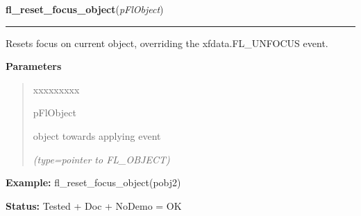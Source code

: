 \hspace{.8\funcindent}\begin{boxedminipage}{\funcwidth}

    \raggedright \textbf{fl\_reset\_focus\_object}(\textit{pFlObject})

    \vspace{-1.5ex}

    \rule{\textwidth}{0.5\fboxrule}
\setlength{\parskip}{2ex}
    Resets focus on current object, overriding the xfdata.FL\_UNFOCUS 
    event.

\setlength{\parskip}{1ex}
      \textbf{Parameters}
      \vspace{-1ex}

      \begin{quote}
        \begin{Ventry}{xxxxxxxxx}

          \item[pFlObject]

          object towards applying event

            {\it (type=pointer to FL\_OBJECT)}

        \end{Ventry}

      \end{quote}

\textbf{Example:} fl\_reset\_focus\_object(pobj2)



\textbf{Status:} Tested + Doc + NoDemo = OK



    \end{boxedminipage}

    \label{xformslib:flbasic:fl_set_form_atclose}

    \vspace{0.5ex}

